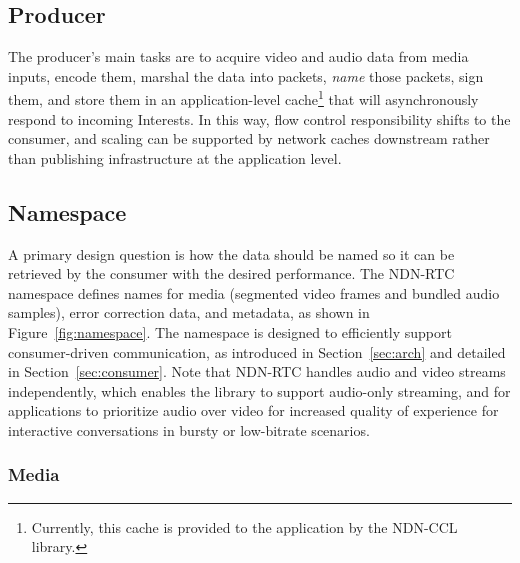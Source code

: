 \documentclass{icn/sig-alternate-2013} %
\newcommand{\ndnrtcName}{NDN-RTC} %
\begin{document}

\subsection{Producer}
The producer's main tasks are to acquire video and audio data from media inputs, encode them, marshal the data into packets, \textit{name} those packets, sign them, and store them in an application-level cache\footnote{Currently, this cache is provided to the application by the NDN-CCL library.} that will asynchronously respond to incoming Interests. In this way, flow control responsibility shifts to the consumer, and scaling can be supported by network caches downstream rather than publishing infrastructure at the application level.  

\subsection{Namespace}

A primary design question is how the data should be named so it can be retrieved by the consumer with the desired performance. The \ndnrtcName{} namespace defines names for media (segmented video frames and bundled audio samples), error correction data, and metadata, as shown in Figure~\ref{fig:namespace}.  The namespace is designed to efficiently support consumer-driven communication, as introduced in Section~\ref{sec:arch} and detailed in Section~\ref{sec:consumer}. Note that \ndnrtcName{} handles audio and video streams independently, which enables the library to support audio-only streaming, and for applications to prioritize audio over video for increased quality of experience for interactive conversations in bursty or low-bitrate scenarios.  

\subsubsection{Media} 
\end{document}
